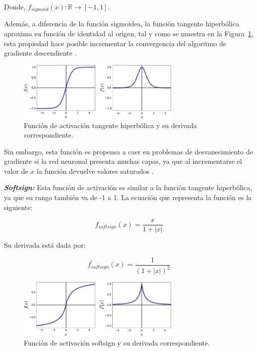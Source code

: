 Donde, $  f_{sigmoid}(x) : \mathbb{R} \rightarrow  [-1,1] $.

Además, a diferencia de la función sigmoidea, la función tangente hiperbólica aproxima su función de identidad al origen, tal y como se muestra en la Figura~\ref{fig:tangent}, esta propiedad hace posible incrementar la convergencia del algoritmo de gradiente descendiente \cite{aghdam2017guide}.

\begin{figure}[H]
    \begin{center}
        \includegraphics[width=0.7\textwidth]{Images/tangent.png}
    \end{center}
    \caption{Función de activación tangente hiperbólica y su derivada correspondiente.}
    \label{fig:tangent}
\end{figure}

Sin embargo, esta función es propensa a caer en problemas de desvanecimiento de gradiente si la red neuronal presenta muchas capas, ya que al incrementarse el valor de $x$ la función devuelve valores saturados  \cite{aghdam2017guide}.

\textbf{\textit{Softsign:}} Esta función de activación es similar a la función tangente hiperbólica, ya que su rango también va de -1 a 1. La ecuación que representa la función es la siguiente:

\begin{equation}
    f_{softsign}(x) = \frac{x}{1 + |x|}
\end{equation}

Su derivada está dada por:

\begin{equation}
    f^{'}_{softsign}(x) = \frac{1}{(1 + |x|)^{2}}
\end{equation}

\begin{figure}[H]
    \begin{center}
        \includegraphics[width=0.7\textwidth]{Images/softsign.png}
    \end{center}
    \caption{Función de activación softsign y su derivada correspondiente.}
    \label{fig:softsign}
\end{figure}

